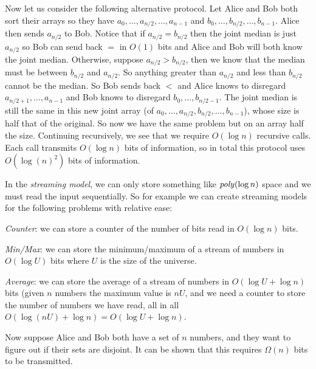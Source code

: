 Now let us consider the following alternative protocol.
Let Alice and Bob both sort their arrays so they have $a_0,\dots,a_{n/2},\dots,a_{n-1}$ and $b_0,\dots,b_{n/2},\dots,b_{n-1}$.
Alice then sends $a_{n/2}$ to Bob.
Notice that if $a_{n/2}=b_{n/2}$ then the joint median is just $a_{n/2}$ so Bob can send back $=$ in $O(1)$ bits and Alice and Bob will both know the joint median.
Otherwise, suppose $a_{n/2}>b_{n/2}$, then we know that the median must be between $b_{n/2}$ and $a_{n/2}$.
So anything greater than $a_{n/2}$ and less than $b_{n/2}$ cannot be the median.
So Bob sends back $<$ and Alice knows to disregard $a_{n/2+1},\dots,a_{n-1}$ and Bob knows to disregard $b_0,\dots,b_{n/2-1}$.
The joint median is still the same in this new joint array (of $a_0,\dots,a_{n/2},b_{n/2},\dots,b_{n-1}$), whose size is half that of the original.
So now we have the same problem but on an array half the size.
Continuing recursively, we see that we require $O(\log n)$ recursive calls.
Each call transmits $O(\log n)$ bits of information, so in total this protocol uses $O(\log(n)^2)$ bits of information.

In the {\it streaming model}, we can only store something like ${\it poly}(\log n)$ space and we must read the input sequentially.
So for example we can create streaming models for the following problems with relative ease:
\benum
    \item {\it Counter}: we can store a counter of the number of bits read in $O(\log n)$ bits.
    \item {\it Min/Max}: we can store the minimum/maximum of a stream of numbers in $O(\log U)$ bits where $U$ is the size of the universe.
    \item {\it Average}: we can store the average of a stream of numbers in $O(\log U+\log n)$ bits (given $n$ numbers the maximum value is $nU$, and we need a counter to store the number of numbers we have
        read, all in all $O(\log(nU)+\log n)=O(\log U+\log n)$.
\eenum

Now suppose Alice and Bob both have a set of $n$ numbers, and they want to figure out if their sets are disjoint.
It can be shown that this requires $\Omega(n)$ bits to be transmitted.

